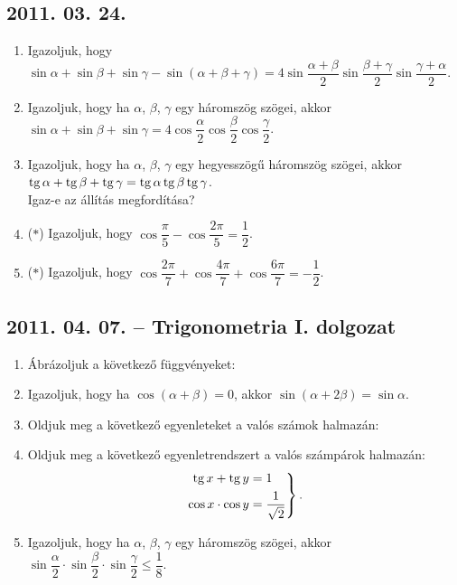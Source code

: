 \subsection*{2011. 03. 24.}
\begin{enumerate}
\item Igazoljuk, hogy $\sin\alpha+\sin\beta+\sin\gamma-\sin(\alpha+\beta+\gamma)=4\sin\dfrac{\alpha+\beta}{2}\sin\dfrac{\beta+\gamma}{2}\sin\dfrac{\gamma+\alpha}{2}$.
\item Igazoljuk, hogy ha $\alpha$, $\beta$, $\gamma$ egy háromszög szögei, akkor $\sin\alpha+\sin\beta+\sin\gamma=4\cos\dfrac{\alpha}{2}\cos\dfrac{\beta}{2}\cos\dfrac{\gamma}{2}$.
\item Igazoljuk, hogy ha $\alpha$, $\beta$, $\gamma$ egy hegyesszögű háromszög szögei, akkor $\mathop{\mathrm{tg}}\nolimits\alpha+\mathop{\mathrm{tg}}\nolimits\beta+\mathop{\mathrm{tg}}\nolimits\gamma=\mathop{\mathrm{tg}}\nolimits\alpha\mathop{\mathrm{tg}}\nolimits\beta\mathop{\mathrm{tg}}\nolimits\gamma$.\\
Igaz-e az állítás megfordítása?
\item ($*$) Igazoljuk, hogy $\cos\dfrac{\pi}{5}-\cos\dfrac{2\pi}{5}=\dfrac{1}{2}$.
\item ($*$) Igazoljuk, hogy $\cos\dfrac{2\pi}{7}+\cos\dfrac{4\pi}{7}+\cos\dfrac{6\pi}{7}=-\dfrac12$.
\end{enumerate}

\subsection*{2011. 04. 07. -- Trigonometria I. dolgozat}
\begin{enumerate}
\item Ábrázoljuk a következő függvényeket:
\item Igazoljuk, hogy ha $\cos(\alpha+\beta)=0$, akkor $\sin(\alpha+2\beta)=\sin\alpha$.
\item Oldjuk meg a következő egyenleteket a valós számok halmazán:
\item Oldjuk meg a következő egyenletrendszert a valós számpárok halmazán:
\[\left.\begin{aligned}
\mathop{\mathrm{tg}}\nolimits x+\mathop{\mathrm{tg}}\nolimits y&=1\\
\cos x\cdot\cos y&=\frac{1}{\sqrt2}
\end{aligned}\right\}.\]
\item Igazoljuk, hogy ha $\alpha$, $\beta$, $\gamma$ egy háromszög szögei, akkor $\sin\dfrac{\alpha}{2}\cdot\sin\dfrac{\beta}{2}\cdot\sin\dfrac{\gamma}{2}\le\dfrac{1}{8}$.
\end{enumerate}

